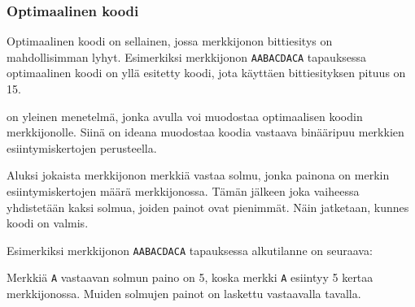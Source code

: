 \subsubsection{Optimaalinen koodi}

Optimaalinen koodi on sellainen, jossa merkkijonon bittiesitys
on mahdollisimman lyhyt.
Esimerkiksi merkkijonon \texttt{AABACDACA} tapauksessa
optimaalinen koodi on yllä esitetty koodi,
jota käyttäen bittiesityksen pituus on 15.

 on yleinen menetelmä,
jonka avulla voi muodostaa optimaalisen koodin merkkijonolle.
Siinä on ideana muodostaa koodia vastaava binääripuu
merkkien esiintymiskertojen perusteella.

Aluksi jokaista merkkijonon merkkiä vastaa solmu,
jonka painona on merkin esiintymiskertojen määrä merkkijonossa.
Tämän jälkeen joka vaiheessa yhdistetään kaksi solmua,
joiden painot ovat pienimmät.
Näin jatketaan, kunnes koodi on valmis.

Esimerkiksi merkkijonon \texttt{AABACDACA} tapauksessa
alkutilanne on seuraava:

\begin{center}
\end{center}
Merkkiä \texttt{A} vastaavan solmun paino on
5, koska merkki \texttt{A} esiintyy 5 kertaa merkkijonossa.
Muiden solmujen painot on laskettu vastaavalla tavalla.

